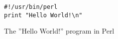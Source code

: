 \documentclass{article}
\begin{document}
\begin{program}
	\begin{verbatim}
#!/usr/bin/perl
print "Hello World!\n"
	\end{verbatim}
  \caption{The ''Hello World!'' program in Perl}
\end{program}
\end{document}
